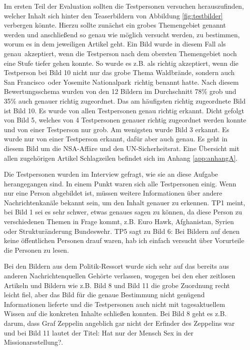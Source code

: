\documentclass[12pt,a4paper,bibtotoc,abstracton]{scrartcl}
\begin{document}
Im ersten Teil der Evaluation sollten die Testpersonen versuchen herauszufinden, welcher Inhalt sich hinter den Teaserbildern von Abbildung \ref{fig:testbilder} verbergen könnte. Hierzu sollte zunächst ein grobes Themengebiet genannt werden und anschließend so genau wie möglich versucht werden, zu bestimmen, worum es in dem jeweiligen Artikel geht. Ein Bild wurde in diesem Fall als \glqq genau\grqq\ akzeptiert, wenn die Testperson nach dem obersten Themengebiet noch eine Stufe tiefer gehen konnte. So wurde es z.B. als richtig akzeptiert, wenn die Testperson bei Bild 10 nicht nur das grobe Thema \glqq Waldbrände\grqq, sondern auch \glqq San Francisco\grqq\ oder \glqq Yosemite Nationalpark\grqq\ richtig benannt hatte. Nach diesem Bewertungsschema wurden von den 12 Bildern im Durchschnitt 78\% grob und 35\% auch genauer richtig zugeordnet. Das am häufigsten richtig zugeordnete Bild ist Bild 10. Es wurde von allen Testpersonen genau richtig erkannt. Dicht gefolgt von Bild 5, welches von 4 Testpersonen genauer richtig zugeordnet werden konnte und von einer Testperson nur grob. Am wenigsten wurde Bild 3 erkannt. Es wurde nur von einer Testperson erkannt, dafür aber auch genau. Es geht in diesem Bild um die NSA-Affäre und den UN-Sicherheitsrat. Eine Übersicht mit allen zugehörigen Artikel Schlagzeilen befindet sich im Anhang \ref{app:anhangA}.

Die Testpersonen wurden im Interview gefragt, wie sie an diese Aufgabe herangegangen sind. In einem Punkt waren sich alle Testpersonen einig. Wenn nur eine Person abgebildet ist, müssen weitere Informationen über andere Nachrichtenkanäle bekannt sein, um den Inhalt genauer zu erkennen. TP1 meint, bei Bild 1 sei es sehr schwer, etwas genaues sagen zu können, da diese Person zu verschiedenen Themen in Frage kommt, z.B. Euro Hawk, Afghanistan, Syrien oder Strukturänderung Bundeswehr. TP5 sagt zu Bild 6: \glqq Bei Bildern auf denen keine öffentlichen Personen drauf waren, hab ich einfach versucht über Vorurteile die Personen zu lesen\grqq. 

Bei den Bildern aus dem Politik-Ressort wurde sich sehr auf das bereits aus anderen Nachrichtenquellen Gehörte verlassen, wogegen bei den eher zeitlosen Artikeln und Bildern wie z.B. Bild 8 und Bild 11 die grobe Zuordnung recht leicht fiel, aber das Bild für die genaue Bestimmung nicht genügend Informationen lieferte und die Testpersonen auch nicht mit tagesaktuellem Wissen auf die konkreten Inhalte schließen konnten. Bei Bild 8 geht es z.B. darum, dass Graf Zeppelin angeblich gar nicht der Erfinder des Zeppelins war und bei Bild 11 lautet der Titel: \glqq Hat nur der Mensch Sex in der Missionarsstellung?\grqq. 
\end{document}
